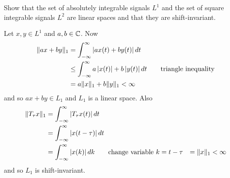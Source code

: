 \begin{excersizelist}

\item \label{exer:L1L2linearshiftinvariant} Show that the set of absolutely integrable signals $L^1$ and the set of square integrable signals $L^2$ are linear spaces and that they are shift-invariant. 
\begin{solution}
Let $x, y \in L^1$ and $a, b \in {\mathbb C}$.  Now
\begin{align*}
\|a x + b y\|_1 &= \int_{-\infty}^\infty \left\vert ax(t) + by(t) \right\vert dt \\
&\leq \int_{-\infty}^\infty a\left\vert x(t) \right\vert + b\left\vert y(t) \right\vert dt \qquad \text{triangle inequality} \\
&= a \|x\|_1 + b\|y\|_1 < \infty
\end{align*}
and so $ax + by \in L_1$ and $L_1$ is a linear space.  Also
\begin{align*}
\|T_\tau x\|_1 &= \int_{-\infty}^\infty \left\vert  T_\tau x(t)  \right\vert dt \\
&= \int_{-\infty}^\infty \left\vert x(t - \tau) \right\vert dt \\
&= \int_{-\infty}^\infty \left\vert x(k) \right\vert dk \qquad \text{change variable $k = t - \tau$}
&= \|x\|_1 < \infty
\end{align*}
and so $L_1$ is shift-invariant.


\end{solution}
\end{excersizelist}

